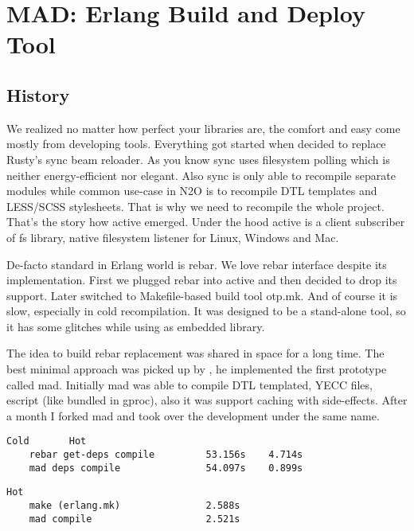 \section{MAD: Erlang Build and Deploy Tool}

\subsection{History}

We realized no matter how perfect your libraries are,
the comfort and easy come mostly from developing tools.
Everything got started when  decided to
replace Rusty's sync beam reloader. As you know sync uses
filesystem polling which is neither energy-efficient nor elegant. Also
sync is only able to recompile separate modules while
common use-case in N2O is to recompile DTL templates
and LESS/SCSS stylesheets. That is why we need to recompile
the whole project. That's the story how active emerged.
Under the hood active is a client subscriber
of fs library, native filesystem listener for Linux, Windows and Mac.

De-facto standard in Erlang world is rebar.
We love rebar interface despite its implementation.
First we plugged rebar into active and then decided to drop its support.
Later switched to Makefile-based build tool otp.mk.
And of course it is slow, especially in cold recompilation.
It was designed to be a stand-alone tool, so it has some
glitches while using as embedded library.

The idea to build rebar replacement was shared in space for a long time.
The best minimal approach was picked up by ,
he implemented the first prototype called mad. Initially mad
was able to compile DTL templated, YECC files, escript (like
bundled in gproc), also it was support caching with side-effects.
After a month I forked mad and took over the development under the same name.

\vspace{1\baselineskip}
\begin{lstlisting}[caption=Example of building N2O sample]
                                   Cold       Hot
    rebar get-deps compile         53.156s    4.714s
    mad deps compile               54.097s    0.899s
\end{lstlisting}
\vspace{1\baselineskip}

\vspace{1\baselineskip}
\begin{lstlisting}[caption=Example of building Cowboy]
                                   Hot
    make (erlang.mk)               2.588s
    mad compile                    2.521s
\end{lstlisting}
\vspace{1\baselineskip}

